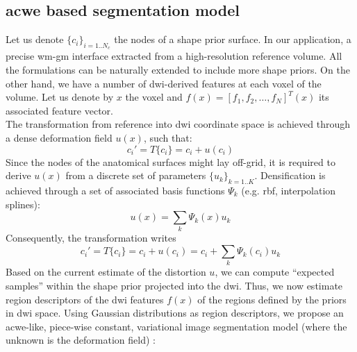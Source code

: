 \subsection{\Acrlong{acwe} based segmentation model}
%
Let us denote $\{c_i\}_{i=1..N_c}$ the nodes of a shape prior surface. In
our application, a precise \gls{wm}-\gls{gm} interface extracted from a
high-resolution reference volume. All the formulations can be naturally
extended to include more shape priors. On the other hand, we have a 
number of \gls{dwi}-derived features at each
voxel of the volume. Let us denote by $x$ the voxel and 
$f(x) = [ f_1, f_2, \ldots, f_N]^T(x)$ its associated feature vector.\\
%
The transformation from reference into \gls{dwi} coordinate space is 
achieved through a dense deformation field $u(x)$, such that:
%
\begin{equation}
c_i' = T\{c_i\} = c_i + u(c_i)
\end{equation}
% 
Since the nodes of the anatomical surfaces might lay off-grid, it is 
required to derive $u(x)$ from a discrete set of parameters $\{u_k\}_{k=1..K}$.
Densification is achieved through a set of associated basis functions 
$\Psi_k$ (e.g. rbf, interpolation splines):
%
\begin{equation}
u(x) = \sum_k \Psi_k(x) u_k
\end{equation}
%
Consequently, the transformation writes
%
\begin{equation}
\label{eq:transformation}
c_i' = T\{c_i\} = c_i + u(c_i) = c_i + \sum_k \Psi_k(c_i)u_k
\end{equation} 
%
%
Based on the current estimate of the distortion $u$, we can compute 
``expected samples'' within the shape prior projected into the \gls{dwi}.
Thus, we now estimate region descriptors of the \gls{dwi} features 
$f(x)$ of the regions defined by the priors in \gls{dwi} space.
%
Using Gaussian distributions as region descriptors, we propose an
\gls{acwe}-like, piece-wise constant, variational image segmentation
model (where the unknown is the deformation field)
\cite{chan_active_2001}:

